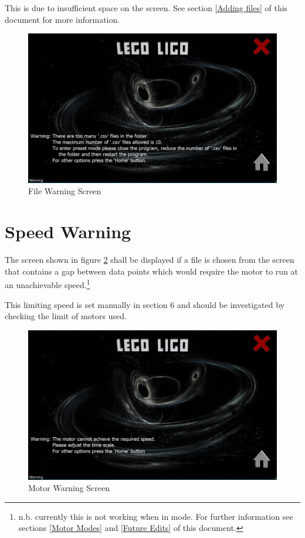 \documentclass[a4paper, 12pt]{book}
\begin{document}
This is due to insufficient space on the screen. See section \ref{Adding files} of this document for more information.
\begin{figure}[ht]
\centering
\includegraphics[width=120mm]{File_Warning_Screen.png}
\caption{File Warning Screen}
\label{fig:File Warning Screen}
\end{figure}

\section{Speed Warning}
The screen shown in figure \ref{fig:Motor Warning Screen} shall be displayed if a file is chosen from the  screen that contains a gap between data points which would require the motor to run at an unachievable speed.\footnote{\label{speed warning note}n.b. currently this is not working when in  mode. For further information see sections \ref{Motor Modes} and \ref{Future Edits} of this document.}

This limiting speed is set manually in section 6 and should be investigated by checking the limit of motors used.
\begin{figure}[ht]
\centering
\includegraphics[width=120mm]{Motor_Warning_Screen.png}
\caption{Motor Warning Screen}
\label{fig:Motor Warning Screen}
\end{figure}
\end{document}
